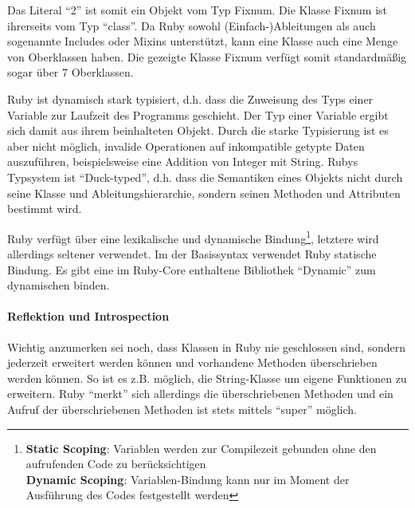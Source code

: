 Das Literal "`2"' ist somit ein Objekt vom Typ Fixnum. Die Klasse Fixnum ist ihrerseits vom Typ "`class"'. Da Ruby sowohl (Einfach-)Ableitungen als auch sogenannte Includes oder Mixins unterstützt, kann eine Klasse auch eine Menge von Oberklassen haben. Die gezeigte Klasse Fixnum verfügt somit standardmäßig sogar über 7 Oberklassen.

Ruby ist dynamisch stark typisiert, d.h. dass die Zuweisung des Typs einer Variable zur Laufzeit des Programms geschieht. Der Typ einer Variable ergibt sich damit aus ihrem beinhalteten Objekt. Durch die starke Typisierung ist es aber nicht möglich, invalide Operationen auf inkompatible getypte Daten auszuführen, beispielsweise eine Addition von Integer mit String. Rubys Typsystem ist "`Duck-typed"', d.h. dass die Semantiken eines Objekts nicht durch seine Klasse und Ableitungshierarchie, sondern seinen Methoden und Attributen bestimmt wird.

Ruby verfügt über eine lexikalische und dynamische Bindung\footnote{
\textbf{Static Scoping}: Variablen werden zur Compilezeit gebunden ohne den aufrufenden Code zu berücksichtigen\\
\textbf{Dynamic Scoping}: Variablen-Bindung kann nur im Moment der Ausführung des Codes festgestellt werden}, letztere wird allerdings seltener verwendet. Im der Basissyntax verwendet Ruby statische Bindung. Es gibt eine im Ruby-Core enthaltene Bibliothek "`Dynamic"' zum dynamischen binden.


\paragraph{Reflektion und Introspection} Wichtig anzumerken sei noch, dass Klassen in Ruby nie geschlossen sind, sondern jederzeit erweitert werden können und vorhandene Methoden überschrieben werden können. So ist es z.B. möglich, die String-Klasse um eigene Funktionen zu erweitern. Ruby "`merkt"' sich allerdings die überschriebenen Methoden und ein Aufruf der überschriebenen Methoden ist stets mittels "`super"' möglich.

